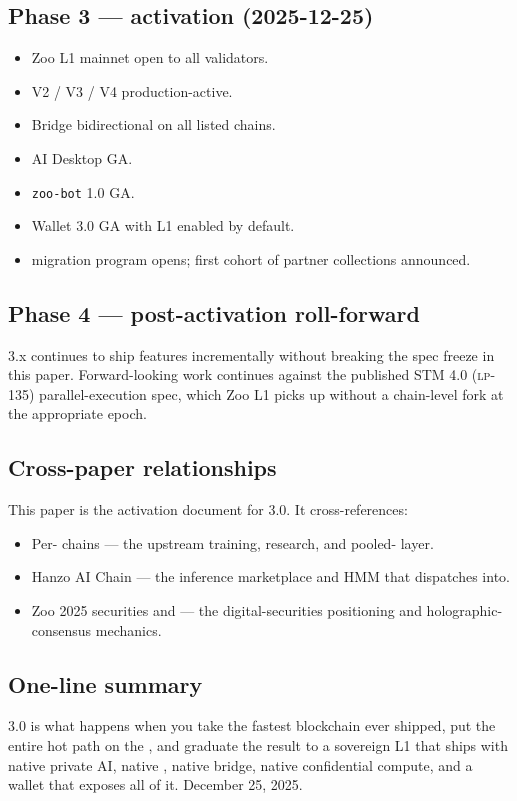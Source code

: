 \subsection{Phase 3 --- activation (2025-12-25)}

\begin{itemize}[leftmargin=1.2em]
  \item Zoo L1 mainnet open to all validators.
  \item \Zoo{} \DEX{} V2 / V3 / V4 production-active.
  \item \Zoo{} Bridge bidirectional on all listed chains.
  \item \Zoo{} AI Desktop GA.
  \item \texttt{zoo-bot} 1.0 GA.
  \item \Lux{} Wallet 3.0 GA with \Zoo{} L1 enabled by default.
  \item \NFT{} migration program opens; first cohort of partner
        collections announced.
\end{itemize}

\subsection{Phase 4 --- post-activation roll-forward}

\Zoo{} 3.x continues to ship features incrementally without breaking
the spec freeze in this paper. Forward-looking work continues against
the published \Quasar{}STM 4.0 (\textsc{lp-135}) parallel-execution
spec, which Zoo L1 picks up without a chain-level fork at the
appropriate epoch.

\subsection{Cross-paper relationships}

This paper is the activation document for \Zoo{} 3.0. It cross-references:

\begin{itemize}[leftmargin=1.2em]
  \item Per-\LLM{} chains \cite{zoo-per-llm-chains} --- the upstream
        training, research, and pooled-\GPU{} layer.
  \item Hanzo AI Chain \cite{hanzo-ai-chain} --- the inference
        marketplace and HMM that \Zoo{} dispatches into.
  \item Zoo 2025 securities and \DAO{} \cite{zoo-2025-securities-and-dao}
        --- the digital-securities positioning and holographic-consensus
        \DAO{} mechanics.
\end{itemize}

\subsection{One-line summary}

\Zoo{} 3.0 is what happens when you take the fastest blockchain ever
shipped, put the entire hot path on the \GPU{}, and graduate the
result to a sovereign L1 that ships with native private AI, native
\AMM{}, native bridge, native confidential compute, and a wallet
that exposes all of it. December 25, 2025.
